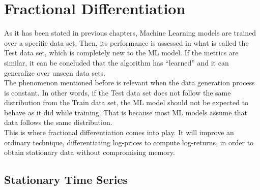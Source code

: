 \documentclass[a4paper]{report}
\begin{document}
\chapter{Fractional Differentiation}
\label{chapterFracDiff}
As it has been stated in previous chapters, Machine Learning models are 
trained over a specific data set. Then, its performance is assessed in what 
is called the Test data set, which is completely new to the ML model. If the 
metrics are similar, it can be concluded that the algorithm has ``learned'' 
and it can generalize over unseen data sets.\\

The phenomenon mentioned before is relevant when the data generation process 
is constant. In other words, if the Test data set does not follow the same 
distribution from the Train data set, the ML model should not be expected to 
behave as it did while training. That is because most ML models assume that 
data follows the same distribution.\\

This is where fractional differentiation comes into play. It will improve an 
ordinary technique, differentiating log-prices to compute log-returns, in 
order to obtain stationary data without compromising memory.

\section{Stationary Time Series}
\label{sec:stationaryTimeSeries}








\end{document}
